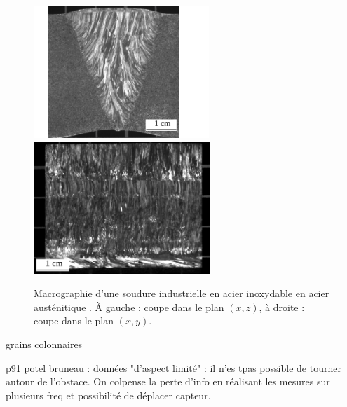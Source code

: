 \begin{figure}
	\includegraphics[height=5cm]{./img/soudure1.png}
	\includegraphics[height=5cm]{./img/soudure2.png}
	\caption{Macrographie d'une soudure industrielle en acier inoxydable en acier austénitique \citep{chassignole}. À gauche : coupe dans le plan $(x,z)$, à droite : coupe dans le plan $(x,y)$.}
\end{figure}

grains colonnaires

p91 potel bruneau : données "d'aspect limité" : il n'es tpas possible de tourner autour de l'obstace. On colpense la perte d'info en réalisant les mesures sur plusieurs freq et possibilité de déplacer capteur.


